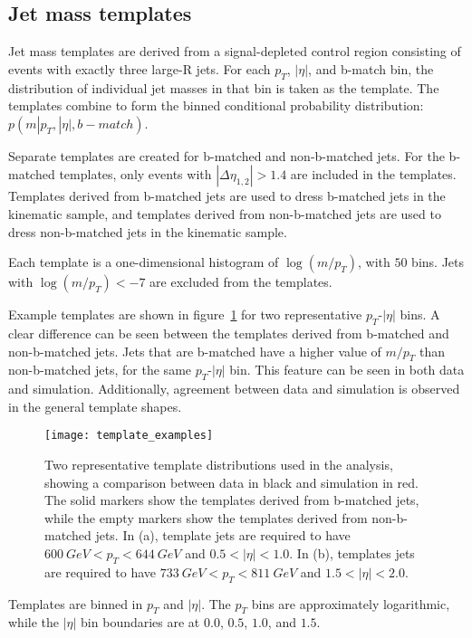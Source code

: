 \subsection{Jet mass templates}\label{subsec:jet_mass_templates}
Jet mass templates are derived from a signal-depleted control region consisting of events with exactly three large-R jets.
For each $p_T$, $|\eta|$, and b-match bin, the distribution of individual jet masses in that bin is taken as the template.
The templates combine to form the binned conditional probability distribution: $p(m|p_{T}, |\eta|, b-match)$.

Separate templates are created for b-matched and non-b-matched jets.
For the b-matched templates, only events with $|\Delta \eta_{1,2}| > 1.4$ are included in the templates.
Templates derived from b-matched jets are used to dress b-matched jets in the kinematic sample,
and templates derived from non-b-matched jets are used to dress non-b-matched jets in the kinematic sample.

Each template is a one-dimensional histogram of $\log\left(m/p_{T}\right)$, with $50$ bins.
Jets with $\log\left(m/p_{T}\right)< -7$ are excluded from the templates.

Example templates are shown in figure~\ref{fig:template_examples} for two representative $p_{T}$-$|\eta|$ bins.
A clear difference can be seen between the templates derived from b-matched and non-b-matched jets.
Jets that are b-matched have a higher value of $m/p_{T}$ than non-b-matched jets, for the same  $p_{T}$-$|\eta|$ bin.
This feature can be seen in both data and simulation.
Additionally, agreement between data and simulation is observed in the general template shapes.

\begin{figure}[!ht]
    \texttt{[image: template\_examples]}
    \caption{Two representative template distributions used in the analysis, showing a comparison between data in black and simulation in red.
    The solid markers show the templates derived from b-matched jets, while the empty markers show the templates derived from non-b-matched jets.
    In (a), template jets are required to have $600~GeV < p_{T} < 644~GeV$ and $0.5 <|\eta|<1.0$.
    In (b), templates jets are required to have $733~GeV < p_{T} < 811~GeV$ and $1.5<|\eta|<2.0$.}
    \label{fig:template_examples}
\end{figure}

Templates are binned in $p_T$ and $|\eta|$.
The $p_T$ bins are approximately logarithmic, while the $|\eta|$ bin boundaries are at $0.0$, $0.5$, $1.0$, and $1.5$.

